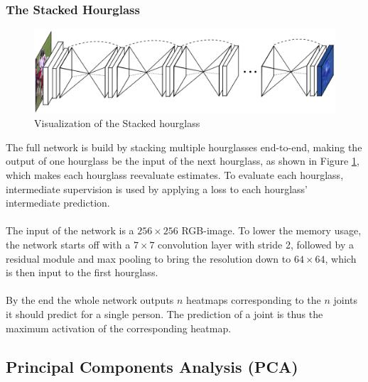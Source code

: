 \documentclass[./main.tex]{subfiles}
\begin{document}
\subsubsection{The Stacked Hourglass}
\begin{figure}[h]
    \centering
    \includegraphics[height = 4 cm]{entities/SHG.png}
    \caption{Visualization of the Stacked hourglass \cite{Newell}}
    \label{fig:SHG}
\end{figure}
\noindent The full network is build by stacking multiple hourglasses end-to-end, making the output of one hourglass be the input of the next hourglass, as shown in Figure \ref{fig:SHG}, which makes each hourglass reevaluate estimates. To evaluate each hourglass, intermediate supervision is used by applying a loss to each hourglass' intermediate prediction.
\\
\\
The input of the network is a $256 \times 256$ RGB-image. To lower the memory usage, the network starts off with a $7 \times 7$ convolution layer with stride 2, followed by a residual module and max pooling to bring the resolution down to $64 \times 64$, which is then input to the first hourglass.
\\
\\
By the end the whole network outputs $n$ heatmaps corresponding to the $n$ joints it should predict for a single person. The prediction of a joint is thus the maximum activation of the corresponding heatmap.

\subsection{Principal Components Analysis (PCA)}
\end{document}
